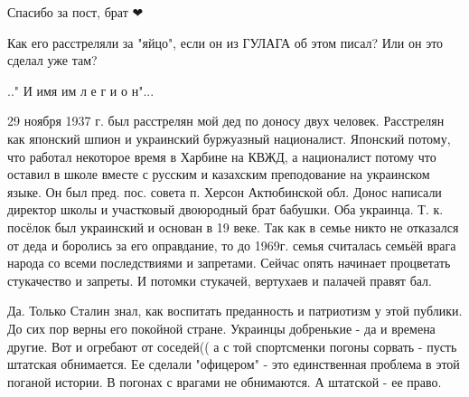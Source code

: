 \begin{itemize}

Спасибо за пост, брат ❤

 
Как его расстреляли за "яйцо", если он из ГУЛАГА об этом писал? Или он это сделал уже там?

 
.." И имя им л е г и о н"...


\par
 

29 ноября 1937 г. был расстрелян мой дед по доносу двух человек. Расстрелян как
японский шпион и украинский буржуазный националист. Японский потому, что работал
некоторое время в Харбине на КВЖД, а националист потому что оставил в школе
вместе с русским и казахским преподование на украинском языке. Он был
пред. пос. совета п. Херсон Актюбинской обл. Донос написали директор школы и
участковый двоюродный брат бабушки. Оба украинца. Т. к. посёлок был украинский и
основан в 19 веке. Так как в семье никто не отказался от деда и боролись за его
оправдание, то до 1969г. семья считалась семьёй врага народа со всеми
последствиями и запретами. Сейчас опять начинает процветать стукачество и
запреты. И потомки стукачей, вертухаев и палачей правят бал.


 

Да. Только Сталин знал, как воспитать преданность и патриотизм у этой публики.
До сих пор верны его покойной стране. Украинцы добренькие - да и времена
другие. Вот и огребают от соседей(( а с той спортсменки погоны сорвать - пусть
штатская обнимается. Ее сделали "офицером" - это единственная проблема в этой
поганой истории. В погонах с врагами не обнимаются. А штатской - ее право.

\end{itemize}

